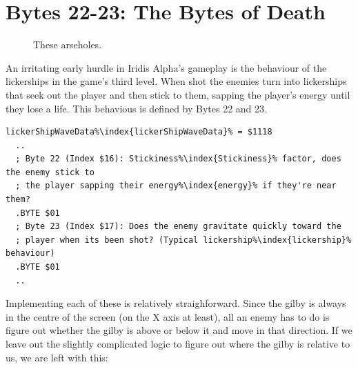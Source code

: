 \section{Bytes 22-23: The Bytes of Death}
\begin{figure}[H]
  {
    \setlength{\tabcolsep}{3.0pt}
    \setlength\cmidrulewidth{\heavyrulewidth} %
	\centering
	\def\MULTICOLORONE{white}
	\def\MULTICOLORTWO{red}
	\def\SPRITECOLOR{gray}
	\begin{subfigure}{0.3\textwidth}
		
	\end{subfigure}
	\begin{subfigure}{0.3\textwidth}
		
	\end{subfigure}
	\begin{subfigure}{0.3\textwidth}
		
	\end{subfigure}
  }\caption[position=top]{These arseholes.}
\end{figure}

An irritating early hurdle in Iridis Alpha's gameplay is the behaviour of the lickerships in the game's third level.
When shot the enemies turn into lickerships that seek out the player and then stick to them, sapping the player's energy
until they lose a life. This behavious is defined by Bytes 22 and 23. 

\begin{lstlisting}[escapechar=\%]
lickerShipWaveData%\index{lickerShipWaveData}% = $1118
  ..
  ; Byte 22 (Index $16): Stickiness%\index{Stickiness}% factor, does the enemy stick to
  ; the player sapping their energy%\index{energy}% if they're near them?
  .BYTE $01
  ; Byte 23 (Index $17): Does the enemy gravitate quickly toward the
  ; player when its been shot? (Typical lickership%\index{lickership}% behaviour)
  .BYTE $01
  ..
\end{lstlisting}

Implementing each of these is relatively straighforward. Since the gilby is always in the centre of the screen (on the
X axis at least), all an enemy has to do is figure out whether the gilby is above or below it and move in that direction.
If we leave out the slightly complicated logic to figure out where the gilby is relative to us, we are left with this:

